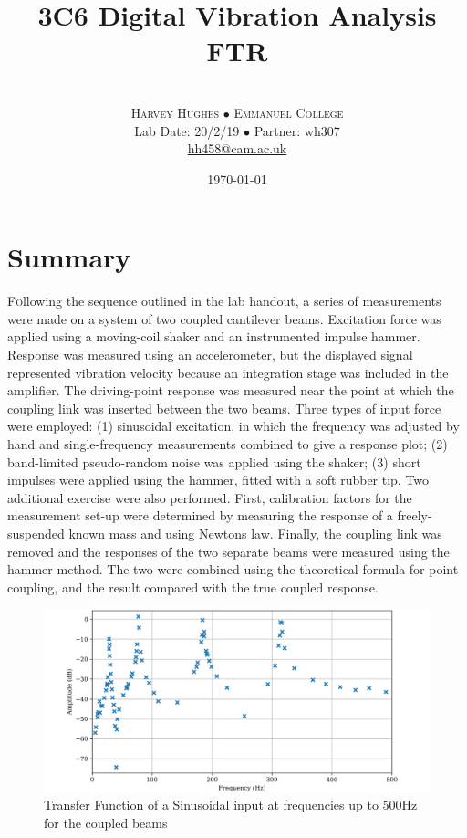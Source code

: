 \documentclass[twoside,onecolumn]{article}
\title{3C6 Digital Vibration Analysis FTR} %
\author{%
\\
\textsc{Harvey Hughes $\bullet$ Emmanuel College } \\
\normalsize Lab Date: 20/2/19 $\bullet$  Partner: wh307 \\
\normalsize \href{mailto:hh458@cam.ac.uk}{hh458@cam.ac.uk} %
}
\date{\today} %
\begin{document}

\maketitle



\section{Summary}

\lettrine[nindent=0em,lines=3]{F}ollowing the sequence outlined in the lab handout, a series of measurements were made on a system of two coupled cantilever beams. Excitation force was applied using a moving-coil shaker and an instrumented impulse hammer.  Response was measured using an accelerometer, but the displayed signal represented vibration velocity because an integration stage was included in the amplifier.  
\newline
\newline
The driving-point response was measured near the point at which the coupling link was inserted between the two beams. Three types of input force were employed: (1) sinusoidal excitation, in which the frequency was adjusted by hand and single-frequency measurements combined to give a response plot; (2) band-limited pseudo-random noise was applied using the shaker; (3) short impulses were applied using the hammer, fitted with a soft rubber tip.
\newline
\newline
Two additional exercise were also performed. First, calibration factors for the measurement set-up were determined by measuring the response of a freely-suspended known mass and using Newtons law. Finally, the coupling link was removed and the responses of the two separate beams were measured using the hammer method.  The two were combined using the theoretical formula for point coupling, and the result compared with the true coupled response.


\begin{figure}[h]
  \centering
    \includegraphics[width=\linewidth]{1-Sin}
  \caption{Transfer Function of a Sinusoidal input at frequencies up to 500Hz for the coupled beams}
  \label{fig:sin}
\end{figure}
\end{document}
